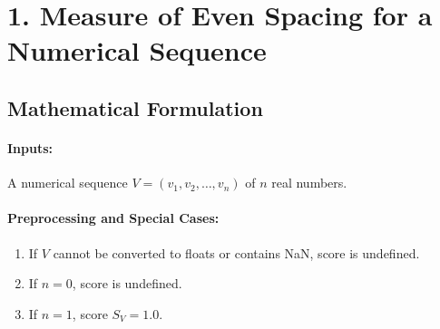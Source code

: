 \documentclass{article}
\begin{document}
\section*{1. Measure of Even Spacing for a Numerical Sequence}

\subsection*{Mathematical Formulation}

\paragraph{Inputs:} A numerical sequence $V = (v_1, v_2, \dots, v_n)$ of $n$ real numbers.

\paragraph{Preprocessing and Special Cases:}
\begin{enumerate}
    \item If $V$ cannot be converted to floats or contains NaN, score is undefined.
    \item If $n=0$, score is undefined.
    \item If $n=1$, score $S_V = 1.0$.
\end{enumerate}
\end{document}
